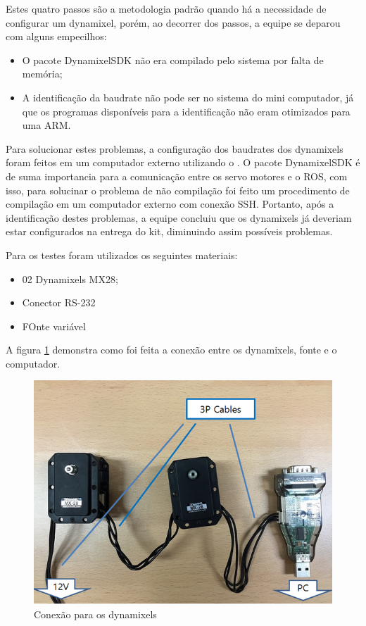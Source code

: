 Estes quatro passos são a metodologia padrão quando há a necessidade de configurar um dynamixel, porém, ao decorrer dos passos, a equipe se deparou com alguns empecilhos:
\begin{itemize}
	\item O pacote DynamixelSDK não era compilado pelo sistema por falta de memória;
	\item A identificação da baudrate não pode ser no sistema do mini computador, já que os programas disponíveis para a identificação não eram otimizados para uma ARM.
\end{itemize}

Para solucionar estes problemas, a configuração dos baudrates dos dynamixels foram feitos em um computador externo utilizando o \cite{mixcell}.
O pacote DynamixelSDK é de suma importancia para a comunicação entre os servo motores e o ROS, com isso, para solucinar o problema de não compilação foi feito um procedimento de compilação em um computador externo com conexão SSH.
Portanto, após a identificação destes problemas, a equipe concluiu que os dynamixels já deveriam estar configurados na entrega do kit, diminuindo assim possíveis problemas.

Para os testes foram utilizados os seguintes materiais:
\begin{itemize}
	\item 02 Dynamixels MX28;
	\item Conector RS-232
	\item FOnte variável
\end{itemize}

A figura \ref{fig:dyna_cone} demonstra como foi feita a conexão entre os dynamixels, fonte e o computador.
\begin{figure}[H]
	\centering
	\includegraphics[scale=0.8, angle=0]{Figures/dynamixel_conexao.png}
	\caption{Conexão para os dynamixels}
	\label{fig:dyna_cone}
\end{figure}


